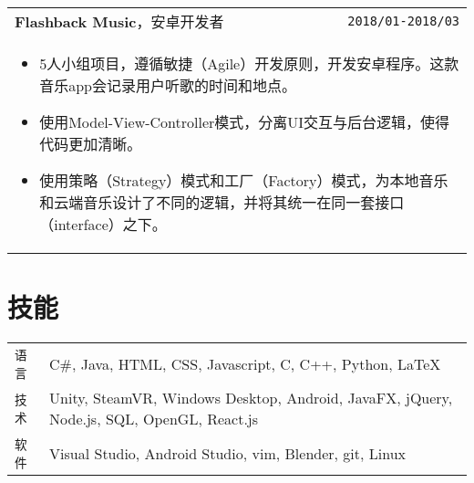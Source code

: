 \documentclass[UTF8]{ctexart}
\newcommand{\itemcols}[1]{
	\multicolumn{2}{p{\dimexpr \linewidth-2\tabcolsep}}{
		\begin{itemize}
			#1
		\end{itemize}
	}
}
\begin{document}
\begin{tabularx}{\linewidth}{X r}
		\textbf{\large Flashback Music}，安卓开发者 & \texttt{2018/01-2018/03} \\
		\itemcols{
			\item 5人小组项目，遵循敏捷（Agile）开发原则，开发安卓程序。这款音乐app会记录用户听歌的时间和地点。
			\item 使用Model-View-Controller模式，分离UI交互与后台逻辑，使得代码更加清晰。
			\item 使用策略（Strategy）模式和工厂（Factory）模式，为本地音乐和云端音乐设计了不同的逻辑，并将其统一在同一套接口（interface）之下。
		}
	\end{tabularx}
	
	
	\section{技能}
	\smallskip
	\noindent
	\begin{tabularx}{\linewidth}{l X}
		\texttt{语言} & C\#, Java, HTML, CSS, Javascript, C, C++, Python, \LaTeX \\
		\texttt{技术} & Unity, SteamVR, Windows Desktop, Android, JavaFX, jQuery, Node.js, SQL, OpenGL, React.js \\
		\texttt{软件} & Visual Studio, Android Studio, vim, Blender, git, Linux
	\end{tabularx}
\end{document}
